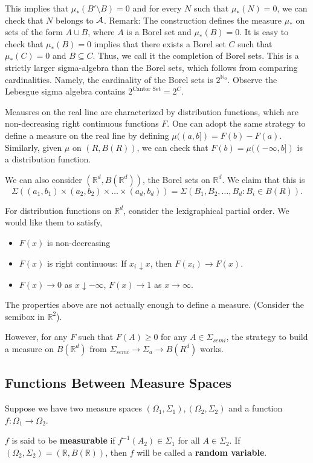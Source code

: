 \documentclass[11pt]{scrartcl}
\newcommand{\N}{\mathbb{N}}
\newcommand{\R}{\mathbb{R}}
\begin{document}
This implies that $\mu_*(B' \setminus B) = 0$ and for every $N$ such that $\mu_*(N) = 0$, we can check that $N$ belongs to $\mathcal A$.  Remark:  The construction defines the measure $\mu_*$ on sets of the form 
$A \cup B$, where $A$ is a Borel set and $\mu_*(B) = 0$.  It is easy to check that $\mu_*(B) = 0$ implies that there exists a Borel set $C$ such that $\mu_*(C) = 0$ and $B \subseteq C$.  Thus, we call it the completion of Borel sets.  This is a strictly larger sigma-algebra than the Borel sets, which follows from comparing cardinalities.  Namely, the cardinality of the Borel sets is $2^{\N_0}$.  Observe the Lebesgue sigma algebra contains $2^\text{Cantor Set} = 2^C$.

Meausres on the real line are characterized by distribution functions, which are non-decreasing right continuous functions $F$.  One can adopt the same strategy to define a measure on the real line by defining $\mu((a, b]) = F(b) - F(a)$.  Similarly, given $\mu$ on $(R, B(R))$, we can check that $F(b) = \mu((-\infty, b])$ is a distribution function. 

We can also consider $(\R^d, B(\R^d))$, the Borel sets on $\R^d$.  We claim that this is
$$\Sigma ((a_1, b_1) \times (a_2, b_2) \times \dots \times (a_d, b_d)) = \Sigma (B_1, B_2, \dots, B_d: B_i \in B(R)).$$

For distribution functions on $\R^d$, consider the lexigraphical partial order.  We would like them to satisfy,
\begin{itemize}
\item $F(x)$ is non-decreasing
\item $F(x)$ is right continuous: If $x_i \downarrow x$, then $F(x_i) \rightarrow F(x)$.
\item $F(x) \rightarrow 0$ as $x \downarrow -\infty$, $F(x) \rightarrow 1$ as $x \rightarrow \infty$.
\end{itemize}
The properties above are not actually enough to define a measure. (Consider the semibox in $\R^2$).  

However, for any $F$ such that $F(A) \ge 0$ for any $A \in \Sigma_{semi}$, the strategy to build a measure on $B(\R^d)$ from $\Sigma_{semi}\rightarrow \Sigma_a \rightarrow B(R^d)$ works.

\subsection{Functions Between Measure Spaces}
Suppose we have two measure spaces $(\Omega_1, \Sigma_1), (\Omega_2, \Sigma_2)$ and a function $f:\Omega_1 \rightarrow \Omega_2$.
\begin{definition} $f$ is said to be \textbf{measurable} if $f^{-1}(A_2) \in \Sigma_1$ for all $A \in \Sigma_2$.  If $(\Omega_2, \Sigma_2) = (\R, B(\R))$, then $f$ will be called a \textbf{random variable}.
\end{definition}
\end{document}
